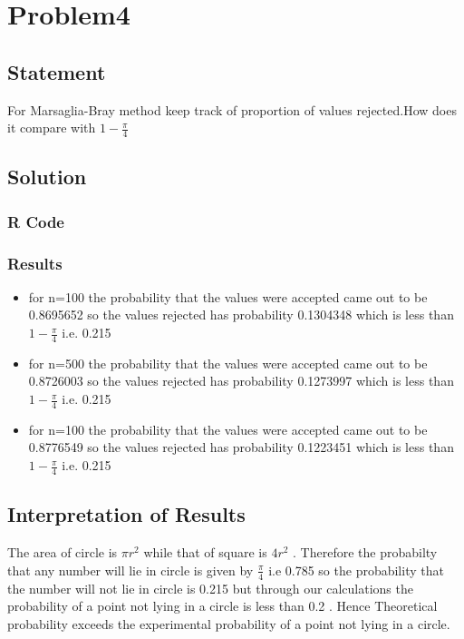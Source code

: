 \documentclass[10pt]{article}
\begin{document}
\section{Problem4}
\subsection{Statement}
For Marsaglia-Bray method keep track of proportion of values rejected.How does it compare with $ 1 - \frac{\pi}{4} $
\subsection{Solution}
\subsubsection{R Code}

\subsubsection{Results}
\begin{itemize}
\item for n=100 the probability that the values were accepted came out to be 0.8695652 so the values rejected has probability 0.1304348 which is less than  $ 1 - \frac{\pi}{4} $ i.e. 0.215
\item for n=500 the probability that the values were accepted came out to be 0.8726003 so the values rejected has probability 0.1273997 which is less than  $ 1 - \frac{\pi}{4} $ i.e. 0.215
\item for n=100 the probability that the values were accepted came out to be 0.8776549 so the values rejected has probability 0.1223451 which is less than  $ 1 - \frac{\pi}{4} $ i.e. 0.215
\end{itemize}
\subsection{Interpretation of Results}
The area of circle is $ {\pi} r^2 $ while that of square is $ 4r^2 $ . Therefore the probabilty that any number will lie in circle is given 
by $\frac{\pi}{4}$ i.e 0.785 so the probability that the number will not lie in circle is 0.215 but through our calculations the probability of a point not lying in a circle is less than 0.2 . Hence Theoretical probability exceeds the experimental probability of a point not lying in a circle.
\end{document}
